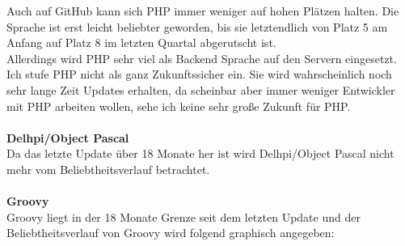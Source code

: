 \documentclass[ngerman]{article}
\begin{document}
    Auch auf GitHub kann sich PHP immer weniger auf hohen Plätzen halten. Die Sprache ist erst leicht beliebter geworden, bis sie letztendlich von Platz 5 am Anfang auf Platz 8 im letzten Quartal abgerutscht ist.\\
    Allerdings wird PHP sehr viel als Backend Sprache auf den Servern eingesetzt.\\
    Ich stufe PHP nicht als ganz Zukunftssicher ein. Sie wird wahrscheinlich noch sehr lange Zeit Updates erhalten, da scheinbar aber immer weniger Entwickler mit PHP arbeiten wollen, sehe ich keine sehr große Zukunft für PHP.\\\\
    \textbf{Delhpi/Object Pascal}\\
    Da das letzte Update über 18 Monate her ist wird Delhpi/Object Pascal nicht mehr vom Beliebtheitsverlauf betrachtet.\\\\
    \textbf{Groovy}\\
    Groovy liegt in der 18 Monate Grenze seit dem letzten Update und der Beliebtheitsverlauf von Groovy wird folgend graphisch angegeben:
\end{document}
